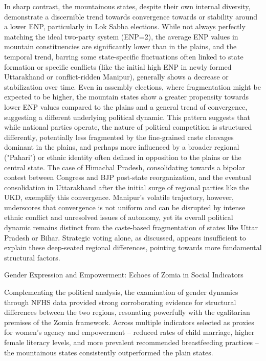 \begin{sloppypar}
In sharp contrast, the mountainous states, despite their own internal diversity, demonstrate a discernible trend towards convergence towards or stability around a lower ENP, particularly in Lok Sabha elections. While not always perfectly matching the ideal two-party system (ENP=2), the average ENP values in mountain constituencies are significantly lower than in the plains, and the temporal trend, barring some state-specific fluctuations often linked to state formation or specific conflicts (like the initial high ENP in newly formed Uttarakhand or conflict-ridden Manipur), generally shows a decrease or stabilization over time. Even in assembly elections, where fragmentation might be expected to be higher, the mountain states show a greater propensity towards lower ENP values compared to the plains and a general trend of convergence, suggesting a different underlying political dynamic. This pattern suggests that while national parties operate, the nature of political competition is structured differently, potentially less fragmented by the fine-grained caste cleavages dominant in the plains, and perhaps more influenced by a broader regional ("Pahari") or ethnic identity often defined in opposition to the plains or the central state. The case of Himachal Pradesh, consolidating towards a bipolar contest between Congress and BJP post-state reorganization, and the eventual consolidation in Uttarakhand after the initial surge of regional parties like the UKD, exemplify this convergence. Manipur's volatile trajectory, however, underscores that convergence is not uniform and can be disrupted by intense ethnic conflict and unresolved issues of autonomy, yet its overall political dynamic remains distinct from the caste-based fragmentation of states like Uttar Pradesh or Bihar. Strategic voting alone, as discussed, appears insufficient to explain these deep-seated regional differences, pointing towards more fundamental structural factors.

Gender Expression and Empowerment: Echoes of Zomia in Social Indicators

Complementing the political analysis, the examination of gender dynamics through NFHS data provided strong corroborating evidence for structural differences between the two regions, resonating powerfully with the egalitarian premises of the Zomia framework. Across multiple indicators selected as proxies for women's agency and empowerment – reduced rates of child marriage, higher female literacy levels, and more prevalent recommended breastfeeding practices – the mountainous states consistently outperformed the plain states.


\end{sloppypar}
